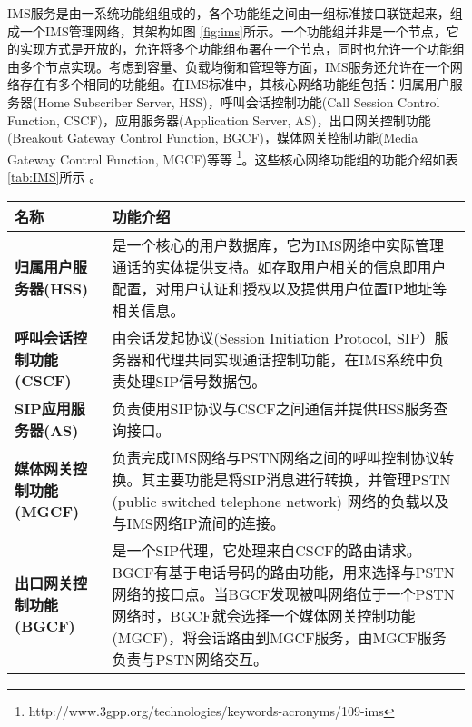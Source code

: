IMS服务是由一系统功能组组成的，各个功能组之间由一组标准接口联链起来，组成一个IMS管理网络，其架构如图 \ref{fig:ims}所示。一个功能组并非是一个节点，它的实现方式是开放的，允许将多个功能组布署在一个节点，同时也允许一个功能组由多个节点实现。考虑到容量、负载均衡和管理等方面，IMS服务还允许在一个网络存在有多个相同的功能组。在IMS标准中，其核心网络功能组包括：归属用户服务器(Home Subscriber Server, HSS)，呼叫会话控制功能(Call Session Control Function, CSCF)，应用服务器(Application Server, AS)，出口网关控制功能(Breakout Gateway Control Function, BGCF)，媒体网关控制功能(Media Gateway Control Function, MGCF)等等 \footnote{http://www.3gpp.org/technologies/keywords-acronyms/109-ims}。这些核心网络功能组的功能介绍如表\ref{tab:IMS}所示 。

\begin{table}
	\centering
	\begin{tabular}{| l | p{9cm} |}  \hline
		名称 & 功能介绍 \\ \hline
	\textbf{归属用户服务器(HSS)}	 & 是一个核心的用户数据库，它为IMS网络中实际管理通话的实体提供支持。如存取用户相关的信息即用户配置，对用户认证和授权以及提供用户位置IP地址等相关信息。	\\ \hline
	\textbf{呼叫会话控制功能(CSCF)}	& 由会话发起协议(Session Initiation Protocol, SIP）服务器和代理共同实现通话控制功能，在IMS系统中负责处理SIP信号数据包。	\\ \hline
	\textbf{SIP应用服务器(AS)} &  负责使用SIP协议与CSCF之间通信并提供HSS服务查询接口。  	\\ \hline
	\textbf{媒体网关控制功能(MGCF)} &负责完成IMS网络与PSTN网络之间的呼叫控制协议转换。其主要功能是将SIP消息进行转换，并管理PSTN (public switched telephone network) 网络的负载以及与IMS网络IP流间的连接。 		\\ \hline
	\textbf{出口网关控制功能(BGCF)} & 是一个SIP代理，它处理来自CSCF的路由请求。BGCF有基于电话号码的路由功能，用来选择与PSTN网络的接口点。当BGCF发现被叫网络位于一个PSTN网络时，BGCF就会选择一个媒体网关控制功能(MGCF)，将会话路由到MGCF服务，由MGCF服务负责与PSTN网络交互。	 	\\ \hline
	\end{tabular}				
\end{table}

